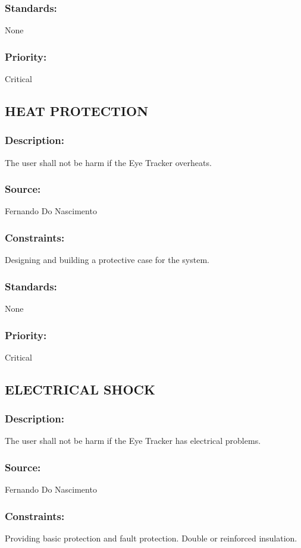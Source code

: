 \subsubsection{Standards:} 
	{None}
\subsubsection{Priority:} 
	{Critical}
\newline
	
\subsection{\text HEAT PROTECTION}
\subsubsection{Description:} 
	{The user shall not be harm if the Eye Tracker overheats.}
\subsubsection{Source:} 
	{Fernando Do Nascimento}
\subsubsection{Constraints:} 
	{Designing and building a protective case for the system.}
\subsubsection{Standards:} 
	{None}
\subsubsection{Priority:} 
	{Critical}
\newline
	
\subsection{\text ELECTRICAL SHOCK}
\subsubsection{Description:} 
	{The user shall not be harm if the Eye Tracker has electrical problems.}
\subsubsection{Source:} 
	{Fernando Do Nascimento}
\subsubsection{Constraints:} 
	{Providing basic protection and fault protection. Double or reinforced insulation.}
